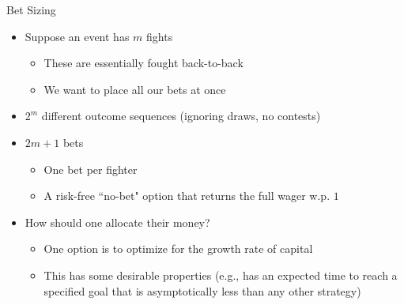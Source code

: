 \documentclass[aspectratio=169,xcolor=dvipsnames]{beamer}
\begin{document}
\begin{frame}{Bet Sizing}
    \begin{itemize}
        \item Suppose an event has $m$ fights
        \begin{itemize}
            \item These are essentially fought back-to-back

            \item We want to place all our bets at once
        \end{itemize}

        \item $2^m$ different outcome sequences (ignoring draws, no contests)

        \item $2m + 1$ bets
        \begin{itemize}
            \item One bet per fighter

            \item A risk-free ``no-bet" option that returns the full wager w.p. $1$
        \end{itemize}

        \item How should one allocate their money?
        \begin{itemize}
            \item One option is to optimize for the growth rate of capital

            \item This has some desirable properties (e.g., has an expected time to reach a specified goal that is asymptotically less than any other strategy)
        \end{itemize}
    \end{itemize}
\end{frame}

\end{document}
